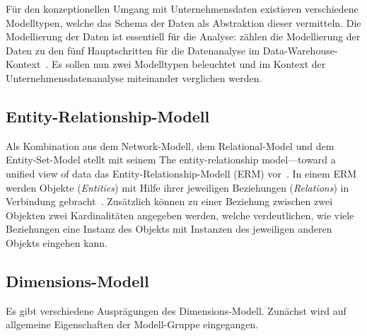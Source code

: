 \documentclass[
  language=german, %
  type=bachelor%
]{isthesis}
\begin{document}
\begin{content}
  Für den konzeptionellen Umgang mit Unternehmensdaten existieren verschiedene
  Modelltypen, welche das Schema der Daten als Abstraktion dieser vermitteln.
  Die Modellierung der Daten ist essentiell für die Analyse:
  \textsc{\citeauthor{phipps2002automating}} zählen die Modellierung der Daten
  zu den fünf Hauptschritten für die Datenanalyse im
  Data-Warehouse-Kontext~\cite[][S. 1]{phipps2002automating}. Es sollen nun
  zwei Modelltypen beleuchtet und im Kontext der Unternehmensdatenanalyse
  miteinander verglichen werden.

  \subsection{Entity-Relationship-Modell}
  Als Kombination aus dem
  Network-Modell, dem Relational-Model und dem Entity-Set-Model stellt
  \citeauthor{chen1976entity} \citeyear{chen1976entity} mit seinem
   \glqq{}The entity-relationship
  model—toward a unified view of data\grqq{} das Entity-Relationship-Modell
  (ERM) vor~\cite[][S. 2]{chen1976entity}. In einem \acrshort{ERM} werden Objekte
  (\textit{Entities}) mit Hilfe ihrer jeweiligen Beziehungen
  (\textit{Relations}) in Verbindung gebracht~\cite[][S. 10]{chen1976entity}.
  Zusätzlich können zu einer Beziehung zwischen zwei Objekten zwei Kardinalitäten
  angegeben werden, welche verdeutlichen, wie viele Beziehungen eine Instanz des
  Objekts mit Instanzen des jeweiligen anderen Objekts eingehen kann\cite[][S.
  38]{ballard1998data}.

  \begin{figure}[caption={Beispiel eines \acrlong{ERM}}, label={fig:img01}]
  \end{figure}


  \subsection{Dimensions-Modell}
  Es gibt verschiedene Ausprägungen des Dimensions-Modell. Zunächst wird auf
  allgemeine Eigenschaften der Modell-Gruppe eingegangen.


\end{content}
\end{document}
